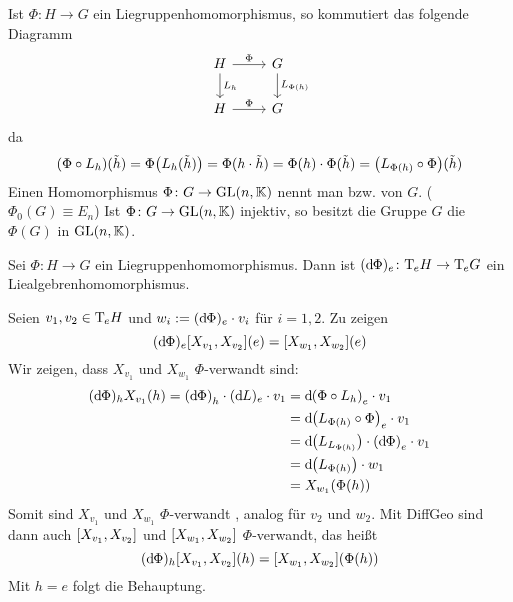 Ist $\Phi \colon H \to G$ ein Liegruppenhomomorphismus, so kommutiert das folgende Diagramm
\[
	\begin{tikzcd}
		H \rar["\Phi"] \dar["L_h"] & G \dar["L_{\Phi(h)}"] \\
		H \rar["\Phi"] & G
	\end{tikzcd}
\]
da
\begin{align}
	(\Phi \circ L_h)(\tilde{h}) = \Phi \enbrace*{L_h(\tilde{h})} = \Phi(h \cdot \tilde{h}) = \Phi(h) \cdot \Phi(\tilde{h}) = \enbrace*{L_{\Phi(h)} \circ \Phi}(\tilde{h})
\end{align}
Einen Homomorphismus $\Phi \colon G \to \GL(n,\mathbb{K})$ nennt man  bzw.  von $G$. ($\Phi_0(G)\equiv E_n$)
Ist $\Phi \colon G \to \GL(n,\mathbb{K})$ injektiv, so besitzt die Gruppe $G$ die  $\Phi(G)$ in $\GL(n,\mathbb{K})$.

\begin{lemma}
	Sei $\Phi \colon H \to G$ ein Liegruppenhomomorphismus.
	Dann ist $(\mathd\Phi)_e \colon \Tmap_e H \to \Tmap_e G$ ein Liealgebrenhomomorphismus.
\end{lemma}
\begin{beweis}
	Seien $v_1,v_2 \in \Tmap_e H$ und $w_i := (\mathd \Phi)_e \cdot v_i$ für $i=1,2$.
	Zu zeigen
	\[
		(\mathd \Phi)_e \benbrace*{X_{v_1}, X_{v_2}} (e) = \benbrace*{X_{w_1},X_{w_2}}(e)
	\]
	Wir zeigen, dass $X_{v_1}$ und $X_{w_1}$ $\Phi$-verwandt sind:
	\begin{align}
		(\mathd \Phi)_h X_{v_1}(h) = \enbrace*{\mathd \Phi}_h \cdot (\mathd L)_e \cdot v_1 &= \mathd \enbrace*{\Phi \circ L_h}_e \cdot v_1 \\
		&= \mathd \enbrace*{L_{\Phi(h)} \circ \Phi}_e \cdot v_1 \\
		&= \mathd \enbrace*{L_{L_{\Phi(h)}}} \cdot \enbrace*{\mathd \Phi}_e \cdot v_1 \\
		&= \mathd \enbrace*{L_{\Phi(h)}} \cdot w_1 \\
		&= X_{w_1}(\Phi(h))
	\end{align}
	Somit sind $X_{v_1}$ und $X_{w_1}$ $\Phi$-verwandt , analog für $v_2$ und $w_2$.
	Mit DiffGeo  sind dann auch $\benbrace*{X_{v_1}, X_{v_2}}$ und $\benbrace*{X_{w_1},X_{w_2}}$ $\Phi$-verwandt, das heißt
	\[
		(\mathd \Phi)_h \benbrace*{X_{v_1},X_{v_2}}(h) = \benbrace*{X_{w_1}, X_{w_2}} \enbrace*{\Phi(h)}
	\]
	Mit $h=e$ folgt die Behauptung.
\end{beweis}

